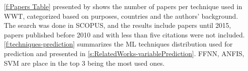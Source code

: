\autoref{f:Papers Table} presented by \cite{Corominas2018} shows the number of papers per technique used in \ac{WWT}, categorized based on purposes, countries and the authors' background. The search was done in SCOPUS, and the results include papers until 2015, papers published before 2010 and with less than five citations were not included. \autoref{f:techniques-prediction} summarizes the \ac{ML} techniques distribution used for prediction and presented in \autoref{s:RelatedWorks-variablePrediction}. \ac{FFNN}, \ac{ANFIS}, \ac{SVM} are place in the top 3 being the most used ones.
